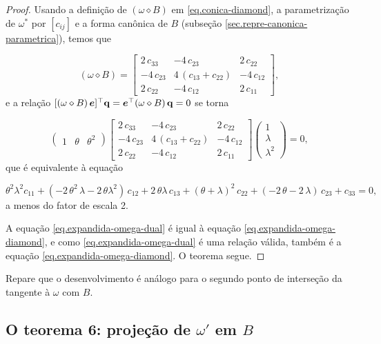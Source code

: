 \begin{proof}
Usando a definição de $(\omega\diamond B)$ em \ref{eq.conica-diamond}, a parametrização de $\omega^*$ por $[c_{ij}]$ e a forma canônica de $B$ (subseção \ref{sec.repre-canonica-parametrica}), temos que

\begin{equation*}
(\omega\diamond B)=
\begin{bmatrix}
2\,c_{33}&-4\,c_{23}&2\,c_{22}\\
-4\,c_{23}&4\,(c_{13}+c_{22})&-4\,c_{12}\\
2\,c_{22}&-4\,c_{12}&2\,c_{11}
\end{bmatrix},
\end{equation*}
e a relação $[(\omega\diamond B)\,\boldsymbol{e}]^\top {\bf q}=\boldsymbol{e}^\top (\omega\diamond B)\,{\bf q}=0$ se torna

\begin{equation*}
\begin{pmatrix}
1&\theta&\theta^2
\end{pmatrix}
\begin{bmatrix}
2\,c_{33}&-4\,c_{23}&2\,c_{22}\\
-4\,c_{23}&4\,(c_{13}+c_{22})&-4\,c_{12}\\
2\,c_{22}&-4\,c_{12}&2\,c_{11}
\end{bmatrix}
\begin{pmatrix}
1\\
\lambda\\
\lambda^2
\end{pmatrix}
=0,
\end{equation*}
que é equivalente à equação

\begin{equation}\label{eq.expandida-omega-diamond}
\theta^2\lambda^2 c_{11}+(-2\,\theta^2\,\lambda-2\,\theta\lambda^2)\,c_{12}+2\,\theta\lambda\,c_{13}+(\theta+\lambda)^2\,c_{22}+(-2\,\theta-2\,\lambda)\,c_{23}+c_{33}=0,
\end{equation}
a menos do fator de escala 2.

A equação \ref{eq.expandida-omega-dual} é igual à equação \ref{eq.expandida-omega-diamond}, e como 
\ref{eq.expandida-omega-dual} é uma relação válida, também é a equação \ref{eq.expandida-omega-diamond}. O teorema segue.
\end{proof}
Repare que o desenvolvimento é análogo para o segundo ponto de interseção da tangente à $\omega$ com $B$.


\subsection{O teorema 6: projeção de $\omega'$ em $B$}\label{sec.teorema-6}

